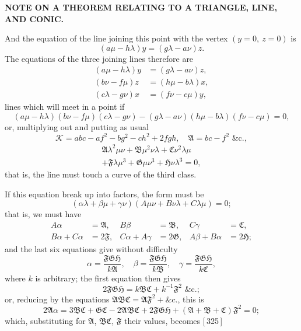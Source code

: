 \documentclass[11pt,a4paper]{article}
\begin{document}
\begin{center}
\textbf{NOTE ON A THEOREM RELATING TO A TRIANGLE, LINE, AND CONIC.}
\end{center}


\bigskip

\noindent And the equation of the line joining this point with the vertex $(y=0,\ z=0)$ is
\[
(a\mu - h\lambda)y = (g\lambda - a\nu)z.
\]
The equations of the three joining lines therefore are
\begin{align*}
(a\mu - h\lambda)y &= (g\lambda - a\nu)z,\\
(b\nu - f\mu)z &= (h\mu - b\lambda)x,\\
(c\lambda - g\nu)x &= (f\nu - c\mu)y,
\end{align*}
lines which will meet in a point if
\[
(a\mu - h\lambda)(b\nu - f\mu)(c\lambda - g\nu) - (g\lambda - a\nu)(h\mu - b\lambda)(f\nu - c\mu) = 0,
\]
or, multiplying out and putting as usual
\[
\mathcal{K} = abc - af^2 - bg^2 - ch^2 + 2fgh, \quad
\mathfrak{A} = bc - f^2 \text{ \&c.},
\]
\begin{multline*}
\mathfrak{A}\lambda^2\mu\nu + \mathfrak{B}\mu^2\nu\lambda + \mathfrak{C}\nu^2\lambda\mu\\
+ \mathfrak{F}\lambda\mu^3 + \mathfrak{G}\mu\nu^3 + \mathfrak{H}\nu\lambda^3 = 0,
\end{multline*}
that is, the line must touch a curve of the third class.

If this equation break up into factors, the form must be
\[
(\alpha\lambda + \beta\mu + \gamma\nu)(A\mu\nu + B\nu\lambda + C\lambda\mu) = 0;
\]
that is, we must have
\begin{align*}
A\alpha &= \mathfrak{A}, & B\beta &= \mathfrak{B}, & C\gamma &= \mathfrak{C},\\
B\alpha + C\alpha &= 2\mathfrak{F}, & C\alpha + A\gamma &= 2\mathfrak{G}, & A\beta + B\alpha &= 2\mathfrak{H};
\end{align*}
and the last six equations give without difficulty
\[
\alpha = \frac{\mathfrak{F}\mathfrak{G}\mathfrak{H}}{k\mathfrak{A}}, \quad
\beta = \frac{\mathfrak{F}\mathfrak{G}\mathfrak{H}}{k\mathfrak{B}}, \quad
\gamma = \frac{\mathfrak{F}\mathfrak{G}\mathfrak{H}}{k\mathfrak{C}},
\]
where $k$ is arbitrary; the first equation then gives
\[
2\mathfrak{F}\mathfrak{G}\mathfrak{H} = k\mathfrak{B}\mathfrak{C} + k^{-1}\mathfrak{F}^2 \text{ \&c.};
\]
or, reducing by the equations $\mathfrak{A}\mathfrak{B}\mathfrak{C} = \mathfrak{A}\mathfrak{F}^2 + \text{\&c.}$, this is
\[
2\mathfrak{A}\alpha = 3\mathfrak{B}\mathfrak{C} + \mathfrak{G}\mathfrak{C} - 2\mathfrak{A}\mathfrak{B}\mathfrak{C} + 2\mathfrak{F}\mathfrak{G}\mathfrak{H} + (\mathfrak{A} + \mathfrak{B} + \mathfrak{C})\mathfrak{F}^2 = 0;
\]
which, substituting for $\mathfrak{A}$, $\mathfrak{B}\mathfrak{C}$, $\mathfrak{F}$ their values, becomes [\,325\,]
\end{document}
